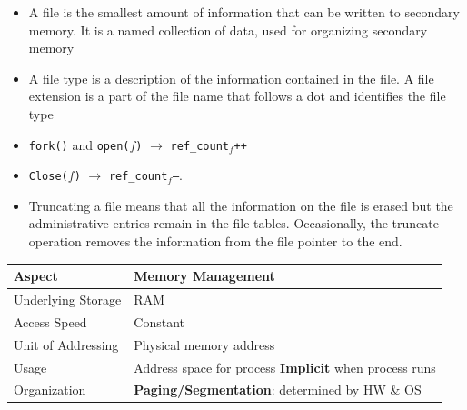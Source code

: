 \documentclass[8pt,twocolumn]{article}
\begin{document}
\begin{itemize}
    \setlength{\itemsep}{0pt} %
    \setlength{\parskip}{0pt}
    \item A file is the smallest amount of information that can be written to secondary memory.
    It is a named collection of data, used for organizing secondary memory
    \item A file type is a description of the information contained in the file. A file extension is
    a part of the file name that follows a dot and identifies the file type
    \item \texttt{fork()} and \texttt{open($f$)} $\rightarrow$ \texttt{ref\_count$_{f}$++}
    \item \texttt{Close($f$)} $\rightarrow$ \texttt{ref\_count$_{f}$--}.
    \item Truncating a file means that all the information on the file is erased but the
    administrative entries remain in the file tables. Occasionally, the truncate operation
    removes the information from the file pointer to the end.
\end{itemize}
\begin{table}[h!]
    \centering
    \renewcommand{\arraystretch}{0.6}
    \begin{tabular}{|l|p{6cm}|}
    \hline
    \textbf{Aspect} & \textbf{Memory Management} \\
    \hline
    Underlying Storage & RAM \\
    \hline
    Access Speed & Constant \\
    \hline
    Unit of Addressing & Physical memory address \\
    \hline
    Usage & Address space for process \newline \textbf{Implicit} when process runs \\
    \hline
    Organization & \textbf{Paging/Segmentation}: determined by HW \& OS \\
    \hline
    \end{tabular}
    \end{table}
\end{document}
